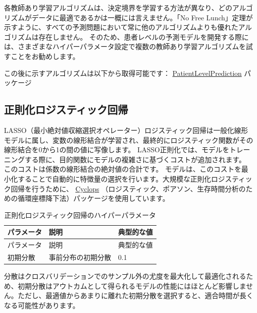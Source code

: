 \documentclass[
  11pt]{book}
\theoremstyle{definition}
\theoremstyle{definition}
\theoremstyle{definition}
\theoremstyle{definition}
\theoremstyle{remark}
\begin{document}
各教師あり学習アルゴリズムは、決定境界を学習する方法が異なり、どのアルゴリズムがデータに最適であるかは一概には言えません。「No Free Lunch」定理が示すように、すべての予測問題において常に他のアルゴリズムよりも優れたアルゴリズムは存在しません。 そのため、患者レベルの予測モデルを開発する際には、さまざまなハイパーパラメータ設定で複数の教師あり学習アルゴリズムを試すことをお勧めします。

この後に示すアルゴリズムは以下から取得可能です： \href{https://ohdsi.github.io/PatientLevelPrediction/}{PatientLevelPrediction} パッケージ

\subsection{正則化ロジスティック回帰}\label{ux6b63ux5247ux5316ux30edux30b8ux30b9ux30c6ux30a3ux30c3ux30afux56deux5e30}

LASSO（最小絶対値収縮選択オペレーター）ロジスティック回帰は一般化線形モデルに属し、変数の線形結合が学習され、最終的にロジスティック関数がその線形結合を0から1の間の値に写像します。 LASSO正則化では、モデルをトレーニングする際に、目的関数にモデルの複雑さに基づくコストが追加されます。 このコストは係数の線形結合の絶対値の合計です。 モデルは、このコストを最小化することで自動的に特徴量の選択を行います。大規模な正則化ロジスティック回帰を行うために、 \href{https://ohdsi.github.io/Cyclops/}{Cyclops} （ロジスティック、ポアソン、生存時間分析のための循環座標降下法）パッケージを使用しています。    

\begin{longtable}[]{@{}lll@{}}
\caption{\label{tab:lassoParameters} 正則化ロジスティック回帰のハイパーパラメータ}\tabularnewline
\toprule\noalign{}
パラメータ & 説明 & 典型的な値 \\
\midrule\noalign{}
\endfirsthead
\toprule\noalign{}
パラメータ & 説明 & 典型的な値 \\
\midrule\noalign{}
\endhead
\bottomrule\noalign{}
\endlastfoot
初期分散 & 事前分布の初期分散 & 0.1 \\
\end{longtable}

分散はクロスバリデーションでのサンプル外の尤度を最大化して最適化されるため、初期分散はアウトカムとして得られるモデルの性能にはほとんど影響しません。ただし、最適値からあまりに離れた初期分散を選択すると、適合時間が長くなる可能性があります。  
\end{document}
